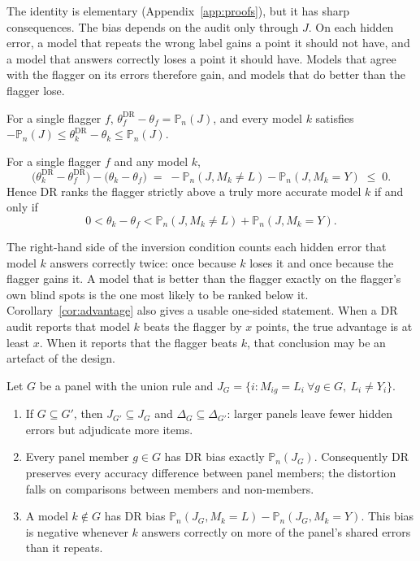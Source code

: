 \documentclass[twoside,11pt]{article}
\newcommand{\Pn}{\mathbb{P}_n}
\newcommand{\1}{\mathbf{1}}
\newcommand{\DR}{\mathrm{DR}}
\newcommand{\Dset}{\Delta}
\begin{document}
The identity is elementary (Appendix~\ref{app:proofs}), but it has sharp consequences. The bias depends on the audit only through $J$. On each hidden error, a model that repeats the wrong label gains a point it should not have, and a model that answers correctly loses a point it should have. Models that agree with the flagger on its errors therefore gain, and models that do better than the flagger lose.

\begin{corollary}\label{cor:flagger}
For a single flagger $f$, $\theta^\DR_f-\theta_f=\Pn(J)$, and every model $k$ satisfies $-\Pn(J)\le\theta^\DR_k-\theta_k\le\Pn(J)$.
\end{corollary}

\begin{corollary}\label{cor:advantage}
For a single flagger $f$ and any model $k$,
\begin{equation}\label{eq:advantage}
\big(\theta^\DR_k-\theta^\DR_f\big)-\big(\theta_k-\theta_f\big)\;=\;-\Pn(J, M_k\neq L)-\Pn(J,M_k=Y)\;\le\;0 .
\end{equation}
Hence DR ranks the flagger strictly above a truly more accurate model $k$ if and only if
\[
0<\theta_k-\theta_f<\Pn(J,M_k\neq L)+\Pn(J,M_k=Y).
\]
\end{corollary}

The right-hand side of the inversion condition counts each hidden error that model $k$ answers correctly twice: once because $k$ loses it and once because the flagger gains it. A model that is better than the flagger exactly on the flagger's own blind spots is the one most likely to be ranked below it. Corollary~\ref{cor:advantage} also gives a usable one-sided statement. When a DR audit reports that model $k$ beats the flagger by $x$ points, the true advantage is at least $x$. When it reports that the flagger beats $k$, that conclusion may be an artefact of the design.

\begin{proposition}\label{prop:panel}
Let $G$ be a panel with the union rule and $J_G=\{i: M_{ig}=L_i\ \forall g\in G,\ L_i\neq Y_i\}$.
\begin{enumerate}
\item[(a)] If $G\subseteq G'$, then $J_{G'}\subseteq J_G$ and $\Dset_G\subseteq\Dset_{G'}$: larger panels leave fewer hidden errors but adjudicate more items.
\item[(b)] Every panel member $g\in G$ has DR bias exactly $\Pn(J_G)$. Consequently DR preserves every accuracy difference between panel members; the distortion falls on comparisons between members and non-members.
\item[(c)] A model $k\notin G$ has DR bias $\Pn(J_G,M_k=L)-\Pn(J_G,M_k=Y)$. This bias is negative whenever $k$ answers correctly on more of the panel's shared errors than it repeats.
\end{enumerate}
\end{proposition}
\end{document}
